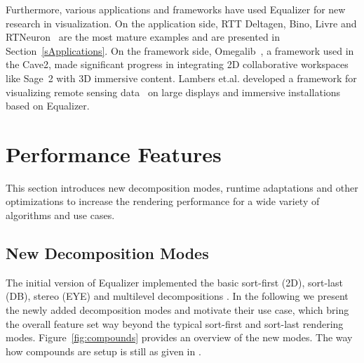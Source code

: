 \documentclass[10pt,journal,compsoc]{IEEEtran}
\newcommand{\sref}[1]{Section~\ref{#1}}
\newcommand{\fig}[1]{Figure~\ref{#1}}
\begin{document}
Furthermore, various applications and frameworks have used \textsf{Equalizer}
for new research in visualization. On the application side, \textsf{RTT
Deltagen}, \textsf{Bino}, \textsf{Livre} and \textsf{RTNeuron}~\cite{HBBES:13}
are the most mature examples and are presented in \sref{sApplications}. On the
framework side, \textsf{Omegalib}~\cite{Omegalib}, a framework used in the
Cave2, made significant progress in integrating 2D collaborative workspaces like
\textsf{Sage~2} with 3D immersive content. Lambers et.al. developed a framework
for visualizing remote sensing data~\cite{LK:09} on large displays and immersive
installations based on Equalizer.

\section{Performance Features}

This section introduces new decomposition modes, runtime adaptations and other
optimizations to increase the rendering performance for a wide variety of
algorithms and use cases.

\subsection{New Decomposition Modes}

The initial version of \textsf{Equalizer} implemented the basic sort-first (2D),
sort-last (DB), stereo (EYE) and multilevel decompositions \cite{EMP:09}. In the
following we present the newly added decomposition modes and motivate their use
case, which bring the overall feature set way beyond the typical sort-first and
sort-last rendering modes. \fig{fig:compounds} provides an overview of the new
modes. The way how compounds are setup is still as given in \cite{EMP:09}.
\end{document}
